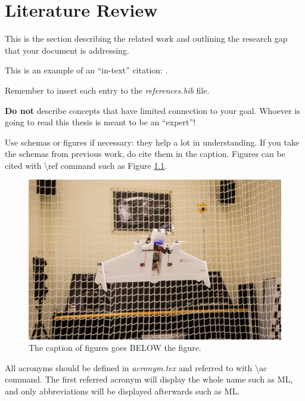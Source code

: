 \chapter{Literature Review}
\label{chap::literature_review}

This is the section describing the related work and outlining the research gap that your document is addressing.

This is an example of an ``in-text'' citation: \cite{jordan2015machine}.

Remember to insert each entry to the \textit{references.bib} file.

\textbf{Do not} describe concepts that have limited connection to your goal. Whoever is going to read this thesis is meant to be an ``expert''!

Use schemas or figures if necessary: they help a lot in understanding. If you take the schemas from previous work, do cite them in the caption. Figures can be cited with \textbackslash ref command such as Figure \ref{fig::example_picture}.

\begin{figure}[!htbp]
    \centering
    \includegraphics[width=0.75\columnwidth]{images/figures/example_figure.jpg}
    \caption{The caption of figures goes BELOW the figure.}
    \label{fig::example_picture}
\end{figure}

All acronyms should be defined in \textit{acronym.tex} and referred to with \textbackslash ac command. The first referred acronym will display the whole name such as \ac{ML}, and only abbreviations will be displayed afterwards such as \ac{ML}.
